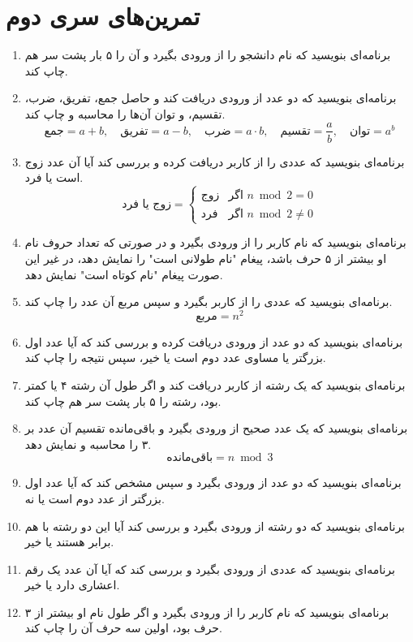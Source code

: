 \documentclass[b5paper,12pt]{article}
\begin{document}
	\newpage
	\section*{تمرین‌های سری دوم}
	\begin{enumerate}
		
		\item برنامه‌ای بنویسید که نام دانشجو را از ورودی بگیرد و آن را ۵ بار پشت سر هم چاپ کند.
		\item برنامه‌ای بنویسید که دو عدد از ورودی دریافت کند و حاصل جمع، تفریق، ضرب، تقسیم، و توان آن‌ها را محاسبه و چاپ کند.
		\[ 
		\text{جمع} = a + b, \quad 
		\text{تفریق} = a - b, \quad 
		\text{ضرب} = a \cdot b, \quad 
		\text{تقسیم} = \frac{a}{b}, \quad 
		\text{توان} = a^b
		\]
		\item برنامه‌ای بنویسید که عددی را از کاربر دریافت کرده و بررسی کند آیا آن عدد زوج است یا فرد.
		\[ 
		\text{زوج یا فرد} = 
		\begin{cases} 
			\text{زوج} & \text{اگر } n \bmod 2 = 0 \\ 
			\text{فرد} & \text{اگر } n \bmod 2 \neq 0 
		\end{cases} 
		\]
		\item برنامه‌ای بنویسید که نام کاربر را از ورودی بگیرد و در صورتی که تعداد حروف نام او بیشتر از ۵ حرف باشد، پیغام "نام طولانی است" را نمایش دهد، در غیر این صورت پیغام "نام کوتاه است" نمایش دهد.
		\item برنامه‌ای بنویسید که عددی را از کاربر بگیرد و سپس مربع آن عدد را چاپ کند.
		\[ 
		\text{مربع} = n^2 
		\]
		\item برنامه‌ای بنویسید که دو عدد از ورودی دریافت کرده و بررسی کند که آیا عدد اول بزرگتر یا مساوی عدد دوم است یا خیر، سپس نتیجه را چاپ کند.
		\item برنامه‌ای بنویسید که یک رشته از کاربر دریافت کند و اگر طول آن رشته ۴ یا کمتر بود، رشته را ۵ بار پشت سر هم چاپ کند.
		\item برنامه‌ای بنویسید که یک عدد صحیح از ورودی بگیرد و باقی‌مانده تقسیم آن عدد بر ۳ را محاسبه و نمایش دهد.
		\[ 
		\text{باقی‌مانده} = n \bmod 3 
		\]
		\item برنامه‌ای بنویسید که دو عدد از ورودی بگیرد و سپس مشخص کند که آیا عدد اول بزرگتر از عدد دوم است یا نه.
		\item برنامه‌ای بنویسید که دو رشته از ورودی بگیرد و بررسی کند آیا این دو رشته با هم برابر هستند یا خیر.
		\item برنامه‌ای بنویسید که عددی از ورودی بگیرد و بررسی کند که آیا آن عدد یک رقم اعشاری دارد یا خیر.
		\item برنامه‌ای بنویسید که نام کاربر را از ورودی بگیرد و اگر طول نام او بیشتر از ۳ حرف بود، اولین سه حرف آن را چاپ کند.

\end{enumerate}
\end{document}
